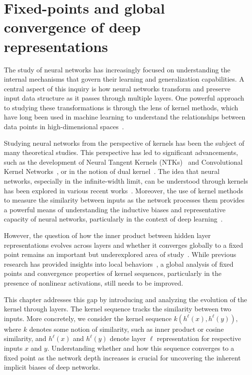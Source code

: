 
\chapter{Fixed-points and global convergence of deep representations}
\label{ch:isometry_activation}

The study of neural networks has increasingly focused on understanding the internal mechanisms that govern their learning and generalization capabilities. A central aspect of this inquiry is how neural networks transform and preserve input data structure as it passes through multiple layers. One powerful approach to studying these transformations is through the lens of kernel methods, which have long been used in machine learning to understand the relationships between data points in high-dimensional spaces~\cite{scholkopf2002learning,smola2004tutorial}.

Studying neural networks from the perspective of kernels has been the subject of many theoretical studies. This perspective has led to significant advancements, such as the development of Neural Tangent Kernels (NTKs)~\cite{jacot2018neural} and Convolutional Kernel Networks~\cite{mairal2014convolutional}, or in the notion of dual kernel~\cite{daniely2016toward}. The idea that neural networks, especially in the infinite-width limit, can be understood through kernels has been explored in various recent works~\cite{lee2019wide, arora2019exact, yang2019scaling}. Moreover, the use of kernel methods to measure the similarity between inputs as the network processes them provides a powerful means of understanding the inductive biases and representative capacity of neural networks, particularly in the context of deep learning~\cite{zhang2017understanding,zhang2021understanding,cho2009kernel}.

However, the question of how the inner product between hidden layer representations evolves across layers and whether it converges globally to a fixed point remains an important but underexplored area of study~\cite{saxe2013exact, schoenholz2016deep, pennington2018emergence}. While previous research has provided insights into local behaviors~\cite{yang2018a}, a global analysis of fixed points and convergence properties of kernel sequences, particularly in the presence of nonlinear activations, still needs to be improved.

This chapter addresses this gap by introducing and analyzing the evolution of the kernel through layers. The kernel sequence tracks the similarity between two inputs. More concretely, we consider the kernel sequence $k(h^\ell(x), h^\ell(y)),$ where $k$ denotes some notion of similarity, such as inner product or cosine similarity, and $h^\ell(x)$ and $h^\ell(y)$ denote layer $\ell$ representation for respective inputs $x$ and $y$. Understanding whether and how this sequence converges to a fixed point as the network depth increases is crucial for uncovering the inherent implicit biases of deep networks.

